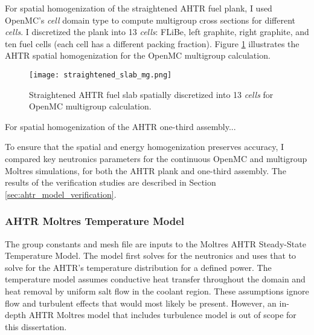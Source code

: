 For spatial homogenization of the straightened \gls{AHTR} fuel plank, I used 
OpenMC's \textit{cell} domain type to compute multigroup cross sections for 
different \textit{cells}. 
I discretized the plank into 13 \textit{cells}: FLiBe, left graphite, right 
graphite, and ten fuel cells (each cell has a different packing fraction).
Figure \ref{fig:straightened_slab_mg} illustrates the \gls{AHTR} spatial 
homogenization for the OpenMC multigroup calculation. 
\begin{figure}[]
    \centering
    \texttt{[image: straightened\_slab\_mg.png]}
    \raggedright
    \caption{Straightened \acrfull{AHTR} fuel slab spatially discretized into 
    13 \textit{cells} for OpenMC multigroup calculation.}
    \label{fig:straightened_slab_mg}
\end{figure}

For spatial homogenization of the \gls{AHTR} one-third assembly... 

To ensure that the spatial and energy homogenization preserves accuracy, I 
compared key neutronics parameters for the continuous OpenMC and multigroup 
Moltres simulations, for both the \gls{AHTR} plank and one-third assembly.
The results of the verification studies are described in Section 
\ref{sec:ahtr_model_verification}.

\subsubsection{AHTR Moltres Temperature Model}
The group constants and mesh file are inputs to the Moltres AHTR Steady-State 
Temperature Model.
The model first solves for the neutronics and uses that to solve for the \gls{AHTR}'s 
temperature distribution for a defined power. 
The temperature model assumes conductive heat transfer throughout the domain 
and heat removal by uniform salt flow in the coolant region. 
These assumptions ignore flow and turbulent effects that would most likely be 
present. 
However, an in-depth AHTR Moltres model that includes turbulence model is 
out of scope for this dissertation. 

